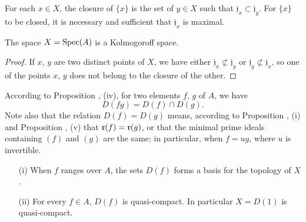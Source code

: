 \begin{cor}[1.1.7]
\label{1.1.1.7}
For each $x\in X$, the closure of $\{x\}$ is the set of $y\in X$ such that
$\mathfrak{j}_x\subset\mathfrak{j}_y$. For $\{x\}$ to be closed, it is necessary and
sufficient that $\mathfrak{j}_x$ is maximal.
\end{cor}

\begin{cor}[1.1.8]
\label{1.1.1.8}
The space $X={\mathop{\mathrm{Spec}}\nolimits}(A)$ is a Kolmogoroff space.
\end{cor}

\begin{proof}
\label{proof-1.1.1.8}
If $x$, $y$ are two distinct points of $X$, we have either
$\mathfrak{j}_x\not\subset\mathfrak{j}_y$ or $\mathfrak{j}_y\not\subset\mathfrak{j}_x$, so
one of the points $x$, $y$ does not belong to the closure of the other.
\end{proof}

\begin{env}[1.1.9]
\label{1.1.1.9}
According to Proposition , (iv), for two elements $f$, $g$ of $A$, we have
\[
  D(fg)=D(f)\cap D(g).
  \tag{1.1.9.1}
\]
Note also that the relation $D(f)=D(g)$ means, according to Proposition
, (i) and Proposition , (v) that $\mathfrak{r}(f)=\mathfrak{r}(g)$, or
that the minimal prime ideals containing $(f)$ and $(g)$ are the same; in particular, when
$f=ug$, where $u$ is invertible.
\end{env}

\begin{prop}[1.1.10]
\label{1.1.1.10}
\medskip\noindent
{}
\begin{itemize}
  \item[{\rm(i)}] When $f$ ranges over $A$, the sets $D(f)$ forms a basis for the topology of $X$.
  \item[{\rm(ii)}] For every $f\in A$, $D(f)$ is quasi-compact. In particular $X=D(1)$ is quasi-compact.
\end{itemize}
\end{prop}

